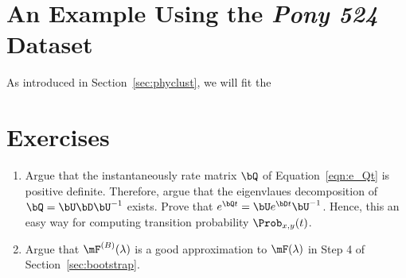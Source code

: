 \section{An Example Using the {\it Pony 524} Dataset}

As introduced in Section~\ref{sec:phyclust}, we will fit the 






\section{Exercises}
\label{sec:phyclust_exercise}

\begin{enumerate}[label=\thechapter-\arabic*]

\item
Argue that the instantaneously rate matrix $\bQ$ of Equation~\ref{eqn:e_Qt}
is positive definite. Therefore, argue that the
eigenvlaues decomposition
of $\bQ = \bU\bD\bU^{-1}$ exists. Prove that
$e^{\bQ t} = \bU e^{\bD t} \bU^{-1}$. Hence, this an easy way for
computing transition probability $\Prob_{x,y}(t)$.

\item
Argue that $\mF^{(B)}(\lambda)$ is a good approximation to $\mF(\lambda)$
in Step 4 of Section~\ref{sec:bootstrap}.

\end{enumerate}

